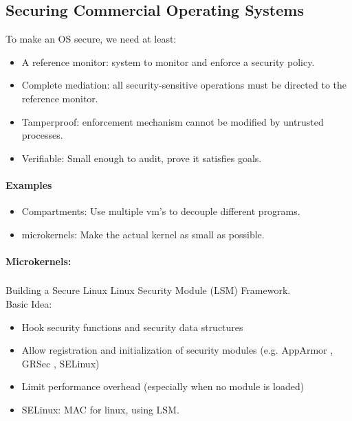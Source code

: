\subsection{Securing Commercial Operating Systems}
To make an OS secure, we need at least:
\begin{itemize}
    \item A reference monitor: system to monitor and enforce a security policy.
    \item Complete mediation: all security-sensitive operations must be directed to the reference monitor.
    \item Tamperproof: enforcement mechanism cannot be modified by untrusted processes.
    \item Verifiable: Small enough to audit, prove it satisfies goals.
\end{itemize}{}

\paragraph{Examples}
\begin{itemize}
    \item Compartments: Use multiple vm's to decouple different programs.
    \item microkernels: Make the actual kernel as small as possible.
\end{itemize}{}

\paragraph{Microkernels:}

\subsubsection{}{Building a Secure Linux}
Linux Security Module (LSM) Framework.\\
Basic Idea: 
\begin{itemize}
    \item Hook security functions and security data structures
    \item Allow registration and initialization of security modules (e.g. AppArmor , GRSec , SELinux)
    \item Limit performance overhead (especially when no module is loaded)
    \item SELinux: MAC for linux, using LSM.
\end{itemize}{}

